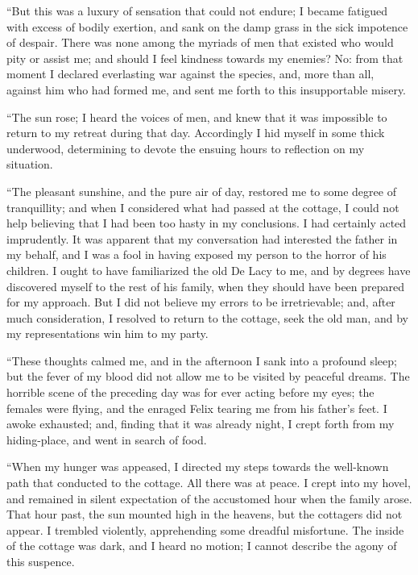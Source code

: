 ``But this was a luxury of sensation
that could not endure; I became fatigued
with excess of bodily exertion,
and sank on the damp grass in the
sick impotence of despair. There was
none among the myriads of men that
existed who would pity or assist me;
and should I feel kindness towards my
enemies? No: from that moment I
declared everlasting war against the
species, and, more than all, against
him who had formed me, and sent me
forth to this insupportable misery.

``The sun rose; I heard the voices
of men, and knew that it was impossible
to return to my retreat during
that day. Accordingly I hid myself in
some thick underwood, determining to
devote the ensuing hours to reflection
on my situation.

``The pleasant sunshine, and the
pure air of day, restored me to some
degree of tranquillity; and when I
considered what had passed at the cottage,
I could not help believing that I
had been too hasty in my conclusions.
I had certainly acted imprudently. It
was apparent that my conversation had
interested the father in my behalf, and
I was a fool in having exposed my
person to the horror of his children.
I ought to have familiarized the old
De Lacy to me, and by degrees have
discovered myself to the rest of his
family, when they should have been
prepared for my approach. But I did
not believe my errors to be irretrievable;
and, after much consideration,
I resolved to return to the cottage, seek
the old man, and by my representations
win him to my party.

``These thoughts calmed me, and in
the afternoon I sank into a profound
sleep; but the fever of my blood did
not allow me to be visited by peaceful
dreams. The horrible scene of the
preceding day was for ever acting before
my eyes; the females were flying,
and the enraged Felix tearing me from
his father's feet. I awoke exhausted;
and, finding that it was already night,
I crept forth from my hiding-place,
and went in search of food.

``When my hunger was appeased, I
directed my steps towards the well-known
path that conducted to the cottage.
All there was at peace. I crept
into my hovel, and remained in silent
expectation of the accustomed hour
when the family arose. That hour past,
the sun mounted high in the heavens,
but the cottagers did not appear. I
trembled violently, apprehending some
dreadful misfortune. The inside of
the cottage was dark, and I heard no
motion; I cannot describe the agony
of this suspence.

